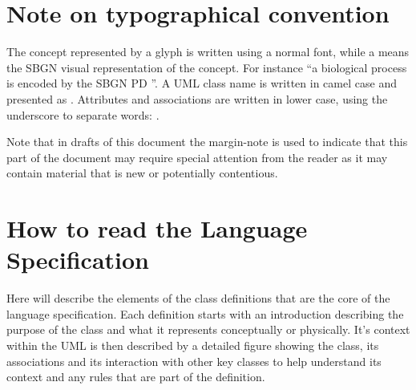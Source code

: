 \section{Note on typographical convention}
The concept represented by a glyph is written using a normal font,
while a  means the SBGN visual representation of the
concept. For instance ``a biological process is encoded by the SBGN PD
''. A UML class name is written in camel case and
presented as . Attributes and
associations are written in lower case, using the underscore to
separate words: .

Note that in drafts of this document the margin-note is used to indicate that this part of the document may
require special attention from the reader as it may contain material
that is new or potentially contentious.

\section{How to read the Language Specification}

Here will describe the elements of the class definitions that are the
core of the language specification. Each definition starts with an
introduction describing the purpose of the class and what it
represents conceptually or physically. It's context within the UML
\PDl is then described by a detailed figure showing the class, its
associations and its interaction with other key classes to help
understand its context and any rules that are part of the
definition.

